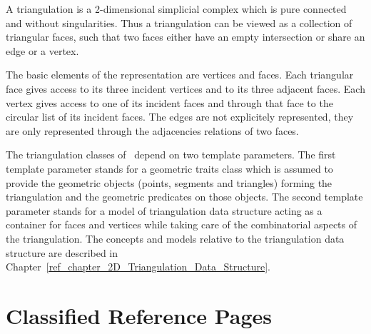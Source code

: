 
\label{ref_chapter_2D_Triangulations}

A triangulation is a 2-dimensional simplicial complex which is pure
connected and without singularities. Thus a triangulation
can be viewed as a collection of triangular faces,
such that two faces either have an empty intersection or share an edge or a vertex.

The basic elements of the representation are vertices and faces.
Each triangular face gives access to its three incident vertices 
and to its three adjacent faces. 
Each vertex gives access to one of its incident faces
and through that face to the circular list of its incident faces.
The edges are not explicitely represented, they are only represented 
through the adjacencies relations of two faces.

The triangulation classes of \cgal\ depend on two template parameters.
The first template parameter stands for
 a geometric traits class which is assumed to provide
the geometric objects (points, segments and triangles) 
forming  the triangulation and the geometric predicates on those objects.
The second template parameter stands for a model
of  triangulation data
structure acting as a container for faces and vertices
while  taking care of the combinatorial aspects of the triangulation. 
The concepts and models relative to the triangulation data structure
are described in
Chapter~\ref{ref_chapter_2D_Triangulation_Data_Structure}.

\section{Classified Reference Pages}

